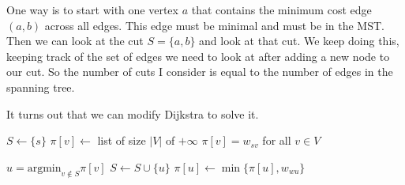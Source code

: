   One way is to start with one vertex $a$ that contains the minimum cost edge $(a, b)$ across all edges.  This edge must be minimal and must be in the MST. Then we can look at the cut $S = \{a, b\}$ and look at that cut. We keep doing this, keeping track of the set of edges we need to look at after adding a new node to our cut. So the number of cuts I consider is equal to the number of edges in the spanning tree.

  \begin{algo}
    It turns out that we can modify Dijkstra to solve it. 
    \begin{algorithm}[H]
      \label{alg:prim}
      \begin{algorithmic}[1]

          \State $S \gets \{s\}$  
          \State $\pi[v] \gets$ list of size $|V|$ of $+\infty$ 
          \State $\pi[v] = w_{sv}$ for all $v \in V$ 

            \State $u = \mathrm{argmin}_{v \notin S} \pi[v]$ 
            \State $S \gets S \cup \{u\}$ 
             
              \State $\pi[u] \gets \min\{\pi[u], w_{wu}\}$  
            \EndFor {}
          \EndWhile
          
        \EndFunction
      \end{algorithmic}
    \end{algorithm}


\end{algo}
